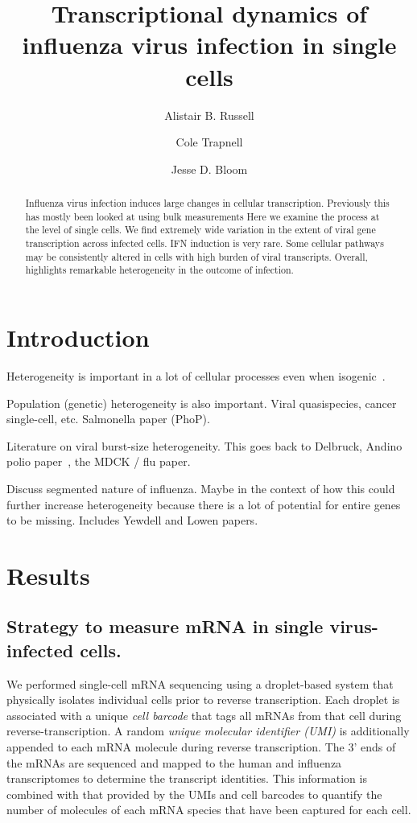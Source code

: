 \documentclass[9pt,lineno]{elife}
\title{Transcriptional dynamics of influenza virus infection in single cells}
\author[1]{Alistair B. Russell}
\author[2]{Cole Trapnell}
\author[1,2*]{Jesse D. Bloom}
\affil[1]{Basic Sciences Division and Computational Biology Program, Fred Hutchinson Cancer Research Center, Seattle, United States}
\affil[2]{Department of Genome Sciences, University of Washington, Seattle, United States}
\begin{document}
\maketitle

\begin{abstract}
Influenza virus infection induces large changes in cellular transcription.
Previously this has mostly been looked at using bulk measurements
Here we examine the process at the level of single cells.
We find extremely wide variation in the extent of viral gene transcription across infected cells.
IFN induction is very rare.
Some cellular pathways may be consistently altered in cells with high burden of viral transcripts.
Overall, highlights remarkable heterogeneity in the outcome of infection.
\end{abstract}


\section{Introduction}

Heterogeneity is important in a lot of cellular processes even when isogenic~\citep{shalek2013single,shalek2014single}.

Population (genetic) heterogeneity is also important. 
Viral quasispecies, cancer single-cell, etc.
Salmonella paper (PhoP).

Literature on viral burst-size heterogeneity.
This goes back to Delbruck, Andino polio paper~\citep{schulte2014single}, the MDCK / flu paper.

Discuss segmented nature of influenza.
Maybe in the context of how this could further increase heterogeneity because there is a lot of potential for entire genes to be missing.
Includes Yewdell and Lowen papers.

\section{Results}

\subsection{Strategy to measure mRNA in single virus-infected cells.}
We performed single-cell mRNA sequencing using a droplet-based system that physically isolates individual cells prior to reverse transcription.
Each droplet is associated with a unique \emph{cell barcode} that tags all mRNAs from that cell during reverse-transcription.
A random \emph{unique molecular identifier (UMI)} is additionally appended to each mRNA molecule during reverse transcription.
The 3' ends of the mRNAs are sequenced and mapped to the human and influenza transcriptomes to determine the transcript identities.
This information is combined with that provided by the UMIs and cell barcodes to quantify the number of molecules of each mRNA species that have been captured for each cell.
\end{document}
